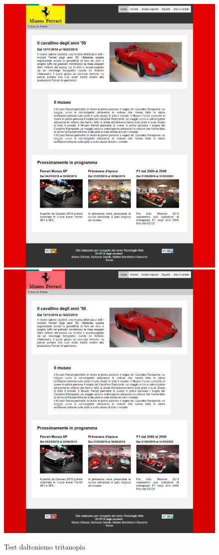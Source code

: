 \begin{figure}[!h]
	\begin{center}
		\includegraphics[scale=0.144]{Images/original.png}
		\includegraphics[scale=0.144]{Images/tritanopia.png}
		\caption{Test daltonismo tritanopia}
	\end{center}
\end{figure}
